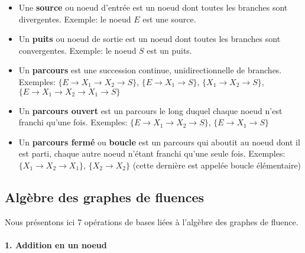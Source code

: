 \begin{itemize}
    \item Une \textbf{source} ou noeud d'entrée est un noeud 
          dont toutes les branches sont divergentes. Exemple: le noeud 
          $E$ est une source.
    \item Un \textbf{puits} ou noeud de sortie est un noeud dont toutes 
    les branches sont convergentes. Exemple: le noeud $S$ est un puits.
    \item Un \textbf{parcours} est une succession continue, 
    unidirectionnelle de branches. Exemples: 
    $\{E\rightarrow X_1\rightarrow X_2\rightarrow S\}$, 
    $\{E\rightarrow X_1\rightarrow S\}$, 
    $\{X_1\rightarrow X_2\rightarrow S\}$, 
    $\{E\rightarrow X_1\rightarrow X_2\rightarrow X_1\rightarrow S\}$

    \item Un \textbf{parcours ouvert} est un parcours le long duquel chaque 
          noeud n'est franchi qu'une fois. Exemples: 
          $\{E\rightarrow X_1\rightarrow X_2\rightarrow S\}$, 
          $\{E\rightarrow X_1 \rightarrow S\}$
    \item Un \textbf{parcours fermé} ou \textbf{boucle} est un parcours qui 
          aboutit au noeud dont il est parti, chaque autre noeud n'étant 
          franchi qu'une seule fois. Exemples: 
          $\{X_1\rightarrow X_2\rightarrow X_1\}$, 
          $\{X_2\rightarrow X_2\}$ (cette dernière est appelée boucle 
          élémentaire)
\end{itemize}

\subsection{Algèbre des graphes de fluences}
Nous présentons ici 7 opérations de bases liées à l'algèbre des 
graphes de fluence.

\paragraph{1. Addition en un noeud}

